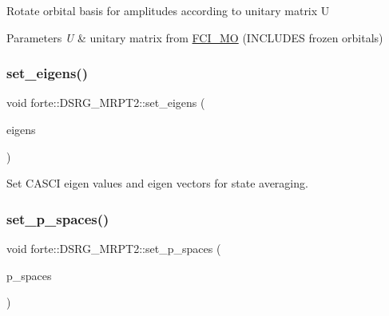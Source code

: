 Rotate orbital basis for amplitudes according to unitary matrix U 
\begin{DoxyParams}{Parameters}
{\em U} & unitary matrix from \mbox{\hyperlink{classforte_1_1_f_c_i___m_o}{F\+C\+I\+\_\+\+MO}} (I\+N\+C\+L\+U\+D\+ES frozen orbitals) \\
\hline
\end{DoxyParams}
\mbox{\label{classforte_1_1_d_s_r_g___m_r_p_t2_a194b1229ce90c93816ebd247e03b6dd2}} 
\subsubsection{\texorpdfstring{set\+\_\+eigens()}{set\_eigens()}}
{\footnotesize\ttfamily void forte\+::\+D\+S\+R\+G\+\_\+\+M\+R\+P\+T2\+::set\+\_\+eigens (\begin{DoxyParamCaption}\item[{const std\+::vector$<$ std\+::vector$<$ std\+::pair$<$ psi\+::\+Shared\+Vector, double $>$$>$$>$ \&}]{eigens }\end{DoxyParamCaption})\hspace{0.3cm}{\ttfamily [inline]}}



Set C\+A\+S\+CI eigen values and eigen vectors for state averaging. 

\mbox{\label{classforte_1_1_d_s_r_g___m_r_p_t2_acc9e874503df77dab79c642ef381efe3}} 
\subsubsection{\texorpdfstring{set\+\_\+p\+\_\+spaces()}{set\_p\_spaces()}}
{\footnotesize\ttfamily void forte\+::\+D\+S\+R\+G\+\_\+\+M\+R\+P\+T2\+::set\+\_\+p\+\_\+spaces (\begin{DoxyParamCaption}\item[{const std\+::vector$<$ std\+::vector$<$ \mbox{\hyperlink{namespaceforte_a2076c63fd7b8732004d9e1442ce527c1}{forte\+::\+Determinant}} $>$$>$ \&}]{p\+\_\+spaces }\end{DoxyParamCaption})\hspace{0.3cm}{\ttfamily [inline]}}



